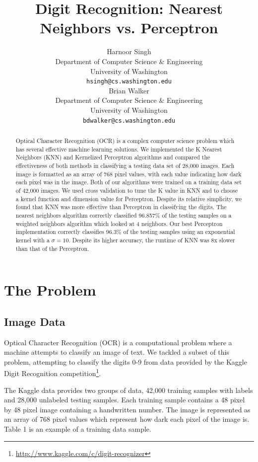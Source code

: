 \documentclass{article} %
\title{Digit Recognition: Nearest Neighbors vs. Perceptron}
\author{
Harnoor Singh \\
Department of Computer Science \& Engineering\\
University of Washington \\
\texttt{hsingh@cs.washington.edu} \\
\And
Brian Walker \\
Department of Computer Science \& Engineering \\
University of Washington \\
\texttt{bdwalker@cs.washington.edu} \\
}
\begin{document}
\maketitle

\begin{abstract}

Optical Character Recognition (OCR) is a complex computer science problem which
has several effective machine learning solutions. We implemented the K Nearest
Neighbors (KNN) and Kernelized Perceptron algorithms and compared the
effectiveness of both methods in classifying a testing data set of 28,000
images. Each image is formatted as an array of 768 pixel values, with each value
indicating how dark each pixel was in the image. Both of our algorithms were
trained on a training data set of 42,000 images. We used cross validation to
tune the K value in KNN and to choose a kernel function and dimension value for
Perceptron. Despite its relative simplicity, we found that KNN was more
effective than Perceptron in classifying the digits. The nearest neighbors
algorithm correctly classified 96.857\% of the testing samples on a weighted
neighbors algorithm which looked at 4 neighbors. Our best Perceptron
implementation correctly classifies 96.3\% of the testing samples using an
exponential kernel with a $\sigma = 10$. Despite its higher accuracy, the runtime
of KNN was 8x slower than that of the Perceptron.

\end{abstract}

\section{The Problem}

\subsection{Image Data}
Optical Character Recognition (OCR) is a computational problem where a machine
attempts to classify an image of text. We tackled a subset of this problem,
attempting to classify the digits 0-9 from data provided by the Kaggle Digit
Recognition
competition\footnote{\url{http://www.kaggle.com/c/digit-recognizer}}.

The Kaggle data provides two groups of data, 42,000 training samples with labels
and 28,000 unlabeled testing samples. Each training sample contains a 48 pixel
by 48 pixel image containing a handwritten number. The image is represented as
an array of 768 pixel values which represent how dark each pixel of the image
is. Table 1 is an example of a training data sample.
\end{document}
